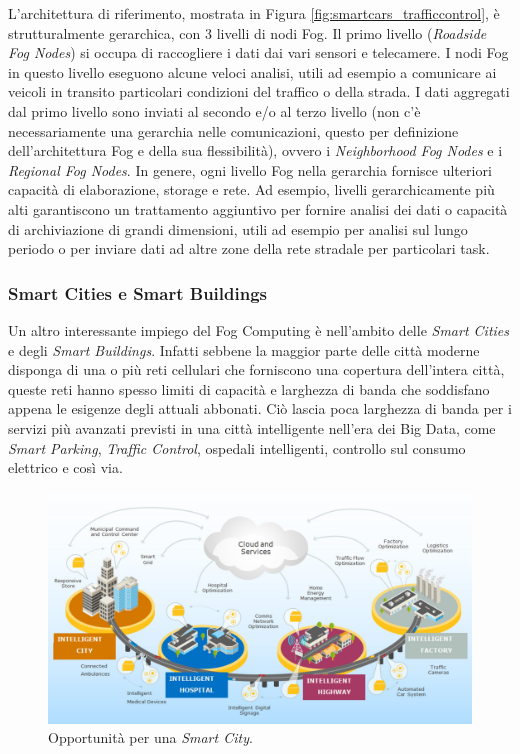 L'architettura di riferimento, mostrata in Figura \ref{fig:smartcars_trafficcontrol}, è strutturalmente gerarchica, con 3 livelli di nodi Fog. Il primo livello (\textit{Roadside Fog Nodes}) si occupa di raccogliere i dati dai vari sensori e telecamere. I nodi Fog in questo livello eseguono alcune veloci analisi, utili ad esempio a comunicare ai veicoli in transito particolari condizioni del traffico o della strada. I dati aggregati dal primo livello sono inviati al secondo e/o al terzo livello (non c'è necessariamente una gerarchia nelle comunicazioni, questo per definizione dell'architettura Fog e della sua flessibilità), ovvero i \textit{Neighborhood Fog Nodes} e i \textit{Regional Fog Nodes}. In genere, ogni livello Fog nella gerarchia fornisce ulteriori capacità di elaborazione, storage e rete. Ad esempio, livelli gerarchicamente più alti garantiscono un trattamento aggiuntivo per fornire analisi dei dati o capacità di archiviazione di grandi dimensioni, utili ad esempio per analisi sul lungo periodo o per inviare dati ad altre zone della rete stradale per particolari task.

\subsubsection{Smart Cities e Smart Buildings}

Un altro interessante impiego del Fog Computing è nell'ambito delle \textit{Smart Cities} e degli \textit{Smart Buildings}. Infatti sebbene  la maggior parte delle città moderne disponga di una o più reti cellulari che forniscono una copertura dell'intera città, queste reti hanno spesso limiti di capacità e larghezza di banda che soddisfano appena le esigenze degli attuali abbonati. Ciò lascia poca larghezza di banda per i servizi più avanzati previsti in una città intelligente nell'era dei Big Data, come \textit{Smart Parking}, \textit{Traffic Control}, ospedali intelligenti, controllo sul consumo elettrico e così via.  

\begin{figure}[!ht]
  \includegraphics[width=14cm]{images/smartcities_smartbuildings}
  \centering
  \caption[Opportunità per una Smart City]{Opportunità per una \textit{Smart City}. \cite{OpenFogReferenceArchitecture}}
  \label{fig:smartcities_smartbuildings}
\end{figure}


